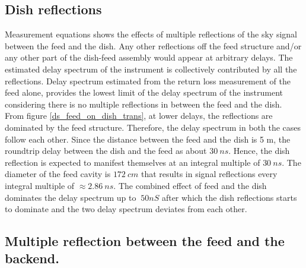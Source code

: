 \documentclass[twocolumn]{emulateapj}
\begin{document}
    
    \subsection{Dish reflections}
    
    Measurement equations shows the effects of multiple reflections of the sky
    signal between the feed and the dish. Any other reflections off the feed
    structure and/or any other part of the dish-feed assembly would appear at
    arbitrary delays. The estimated delay spectrum of the instrument is
    collectively contributed by all the reflections. Delay spectrum estimated from
    the return loss measurement of the feed alone,  provides the lowest limit of
    the delay spectrum of the instrument considering there is no multiple
    reflections in between the feed and the dish.  From figure
    \ref{ds_feed_on_dish_trans}, at lower delays, the reflections are dominated by
    the feed structure. Therefore, the delay spectrum in both the cases follow each
    other. Since the distance between the feed and the dish is 5 m, the roundtrip
    delay between the dish and the feed as about $30~ns$. Hence, the dish
    reflection is expected to manifest themselves at an integral multiple of
    $30~ns$. The diameter of the feed cavity is $172~cm$  that results in signal
    reflections every integral multiple of $\approx2.86~ns$. The combined effect of
    feed and the dish dominates the delay spectrum up to $\> 50nS$ after which the
    dish reflections starts to dominate and the two delay spectrum deviates from
    each other. 
    
    \subsection{Multiple reflection between the feed and the backend.}
    
\end{document}
